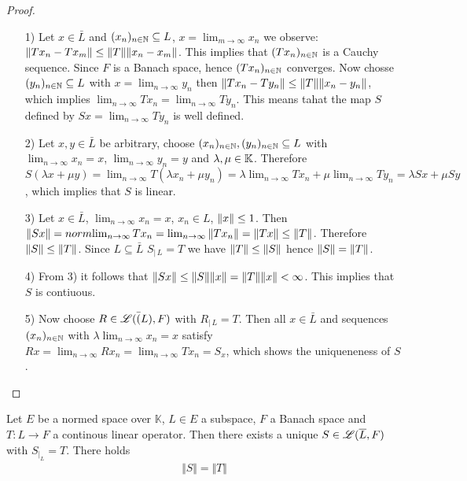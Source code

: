 \begin{proof}
$ \ $
\begin{enumerate}
	\item[1)]Let $x \in \bar{L}$ and  $(x_n)_{n \in \mathbb{N}} \subseteq L$, $x = \lim_{m \rightarrow \infty} x_n $ we observe: $\Vert Tx_n - Tx_m \Vert \le \Vert T \Vert \Vert x_n - x_m \Vert$. This implies that $(Tx_n)_{n \in \mathbb{N}}$ is a Cauchy sequence. Since $F$ is a Banach space, hence $(Tx_n)_{n \in \mathbb{N}}$ converges. Now chosse $(y_n)_{n \in \mathbb{N}} \subseteq L$ with $x= \lim_{n \rightarrow \infty} y_n$ then $\Vert Tx_n - Ty_n \Vert \le \Vert T \Vert \Vert x_n - y_n \Vert$, which implies $\lim_{n \rightarrow \infty} Tx_n = \lim_{n \rightarrow \infty} Ty_n$. This means tahat the map $S$ defined by $Sx = \lim_{n \rightarrow \infty} Ty_n$ is well defined.
	\item[2)] Let $x,y \in \bar{L}$ be arbitrary, choose $(x_n)_{n \in \mathbb{N}}, (y_n)_{n \in \mathbb{N}} \subseteq L$ with $\lim_{n \rightarrow \infty} x_n = x$, $\lim_{n \rightarrow \infty} y_n = y$ and  $\lambda , \mu \in \mathbb{K}$. Therefore $S(\lambda x + \mu y) = \lim_{n \rightarrow \infty} T(\lambda x_n + \mu y_n) = \lambda \lim_{n \rightarrow \infty} Tx_n + \mu \lim_{n \rightarrow \infty} Ty_n = \lambda Sx + \mu Sy$ , which implies that $S$ is linear.
	\item[3)] Let $x \in \bar{L}$, $\lim_{n \rightarrow \infty} x_n = x$, $x_n \in L$, $\Vert x \Vert \le 1$. Then $\Vert Sx \Vert = norm{\lim_{n \rightarrow \infty} Tx_n} = \lim_{n \rightarrow \infty} \Vert Tx_n \Vert=\Vert Tx \Vert \le \Vert T \Vert$. Therefore $\Vert S \Vert \le \Vert T \Vert$. Since $L \subseteq \bar{L}$ $S_{| \, L} = T$ we have $\Vert T \Vert \le \Vert S \Vert$ hence $\Vert S \Vert = \Vert T \Vert$.
	\item[4)] From 3) it follows that $\Vert Sx \Vert \le \Vert S \Vert \Vert x \Vert = \Vert T \Vert \Vert x \Vert < \infty$. This implies that $S$ is contiuous.
	\item[5)] Now choose $R \in \mathscr{L}(\bar(L), F)$ with $R_{| \, L} = T$. Then all $x \in \bar{L}$ and sequences $(x_n)_{n \in \mathbb{N}}$ with $\lambda \lim_{n \rightarrow \infty} x_n = x$ satisfy $Rx = \lim_{n \rightarrow \infty} Rx_n = \lim_{n \rightarrow \infty} Tx_n = S_x$, which shows the uniqueneness of $S$.
\end{enumerate}
\end{proof}

\begin{lemma} \label{lift_from_dense}
    Let $E$ be a normed space over $\mathbb{K}$, $L \in E$ a subspace, $F$ a   	
    Banach space and $T: L \to F$ a continous linear operator. Then there exists a unique $S \in \mathscr L(\overline{L},F)$    
    with 
    $S_{\vert_L}=T$. There holds
		\begin{align*}
			\Vert S \Vert = \Vert T \Vert
		\end{align*}
\end{lemma}

